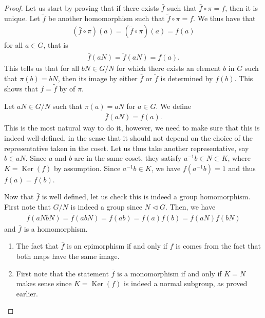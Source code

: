 \documentclass{article}
\begin{document}
\begin{proof}
 Let us start by proving that if there exists $\bar{f}$ such that $\bar{f} \circ \pi=f$, then it is unique. Let $\tilde{f}$ be another homomorphism such that $\tilde{f} \circ \pi=f$. We thus have that
\begin{align*}
(\bar{f} \circ \pi)(a)=(\tilde{f} \circ \pi)(a)=f(a)
\end{align*}
for all $a \in G$, that is
\begin{align*}
\bar{f}(a N)=\tilde{f}(a N)=f(a) .
\end{align*}
This tells us that for all $b N \in G / N$ for which there exists an element $b$ in $G$ such that $\pi(b)=b N$, then its image by either $\bar{f}$ or $\tilde{f}$ is determined by $f(b)$. This shows that $\bar{f}=\tilde{f}$ by  of $\pi$.

 Let $a N \in G / N$ such that $\pi(a)=a N$ for $a \in G$. We define
\begin{align*}
\bar{f}(a N)=f(a) .
\end{align*}
This is the most natural way to do it, however, we need to make sure that this is indeed well-defined, in the sense that it should not depend on the choice of the representative taken in the coset. Let us thus take another representative, say $b \in a N$. Since $a$ and $b$ are in the same coset, they satisfy $a^{-1} b \in N \subset K$, where $K=\operatorname{Ker}(f)$ by assumption. Since $a^{-1} b \in K$, we have $f\left(a^{-1} b\right)=1$ and thus $f(a)=f(b)$.

Now that $\bar{f}$ is well defined, let us check this is indeed a group homomorphism. First note that $G / N$ is indeed a group since $N \triangleleft G$. Then, we have
\begin{align*}
\bar{f}(a N b N)=\bar{f}(a b N)=f(a b)=f(a) f(b)=\bar{f}(a N) \bar{f}(b N)
\end{align*}
and $\bar{f}$ is a homomorphism.
\begin{enumerate}
    \item The fact that $\bar{f}$ is an epimorphism if and only if $f$ is comes from the fact that both maps have the same image.
    \item First note that the statement $\bar{f}$ is a monomorphism if and only if $K=N$ makes sense since $K=\operatorname{Ker}(f)$ is indeed a normal subgroup, as proved earlier.


\end{enumerate}
\end{proof}
\end{document}
